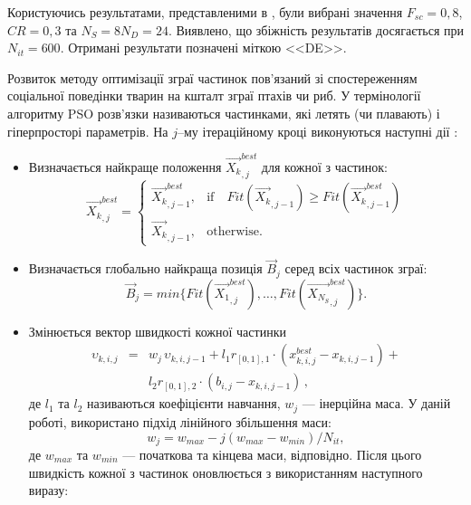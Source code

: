 Користуючись результатами, представленими в \cite{DEWang},
були вибрані значення $F_{sc}=0,8$, $C\!R=0,3$ та $N_S=8N_D=24$.
Виявлено, що збіжність результатів досягається при $N_{it}=600$.
Отримані результати позначені міткою <<DE>>.

Розвиток методу оптимізації зграї частинок пов'язаний зі спостереженням соціальної поведінки тварин на кшталт зграї птахів чи риб.
У термінології алгоритму PSO розв'язки називаються частинками, які летять (чи плавають) і гіперпросторі параметрів.
На $j$--му ітераційному кроці виконуються наступні дії \cite{PSO_Ye}:
\begin{itemize}[leftmargin=0cm,itemindent=1em]
  \item Визначається найкраще положення $\overrightarrow{X_k}_{,j}^{best}$ для кожної з частинок:
 \begin{equation}
 \label{eqPSO_PB}
 \overrightarrow{X_k}_{,j}^{best}=\left\{
 \begin{array}{ll}
 \overrightarrow{X_k}_{,j-1}^{best},& \text{if} \quad Fit(\overrightarrow{X_k}_{,j-1})\geq Fit(\overrightarrow{X_k}_{,j-1}^{best})\\
 \overrightarrow{X_{k}}_{,j-1},& \text{otherwise}.
 \end{array}
 \right.
 \end{equation}
  \item  Визначається глобально найкраща позиція $\overrightarrow{B}_{j}$ серед всіх частинок зграї:
 \begin{equation}
 \label{eqPSO_GB}
 \overrightarrow{B}_{j}=min\{ Fit(\overrightarrow{X_1}_{,j}^{best}),\ldots, Fit(\overrightarrow{X_{N_S}}_{,j}^{best})\}.
 \end{equation}
  \item Змінюється вектор швидкості кожної частинки
\begin{eqnarray}
 \label{eqPSO_Vel}
\upsilon_{k,i,j}&=&w_j\,\upsilon_{k,i,j-1}+l_1r_{[0,1],1}\cdot(x_{k,i,j}^{best}-x_{k,i,j-1})+
\nonumber\\
&&l_2r_{[0,1],2}\cdot(b_{i,j}-x_{k,i,j-1})
\,,
\end{eqnarray}
де
$l_1$ та $l_2$ називаються коефіцієнти навчання, $w_j$ --- інерційна маса.
У даній роботі, використано підхід лінійного збільшення маси:
 \begin{equation}
 \label{eqPSO_W}
 w_j=w_{max}-j(w_{max}-w_{min})/N_{it},
 \end{equation}
де
$w_{max}$ та $w_{min}$ --- початкова та кінцева маси, відповідно.
Після цього швидкість кожної з частинок оновлюється з використанням наступного виразу:

\end{itemize}
